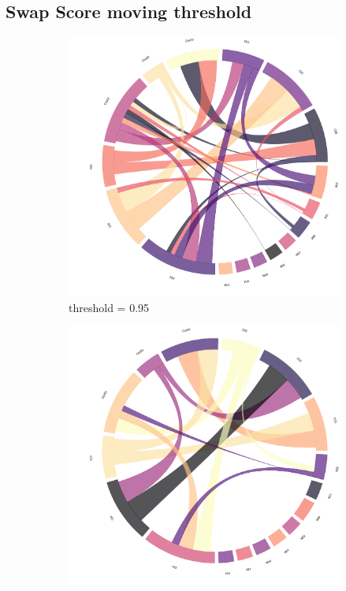\newpage
\subsection{Swap Score moving threshold}
\begin{figure}[!ht]
	\centering
	\begin{subfigure}[b]{0.3\linewidth}
		\includegraphics[width=\linewidth]{figures/chords/chord_swap_Ensemble1000_RCN5333300_095.png}
		\caption{threshold = 0.95}
	\end{subfigure}
	\hfill
	\begin{subfigure}[b]{0.3\linewidth}
		\includegraphics[width=\linewidth]{figures/chords/chord_swap_Ensemble1000_RCN5333300_096.png}

\end{subfigure}
\end{figure}
